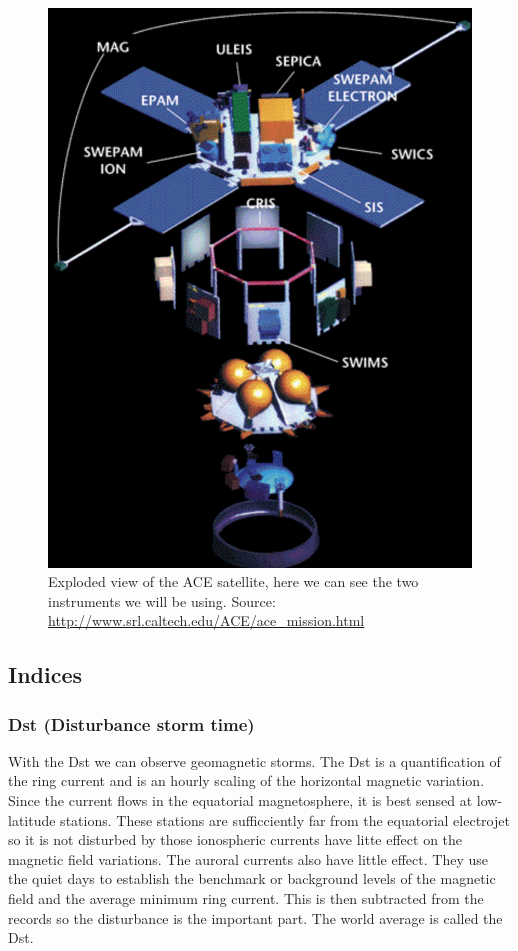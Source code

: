\documentclass[norsk,a4paper,12pt]{article}
\begin{document}
\begin{multicols}{2}
	\begin{figure}[H]
		\includegraphics[scale=0.5]{Figures/ace_exploded.png}
		\centering
		\caption{Exploded view of the ACE satellite, here we can see the two instruments we will be using. Source: \url{http://www.srl.caltech.edu/ACE/ace_mission.html}}
		\label{fig:ace_exploded}
	\end{figure}

\subsection{Indices} %
\label{sub:indices}

\subsubsection{Dst (Disturbance storm time)} %
\label{sub:Dst}
With the Dst we can observe geomagnetic storms. The Dst is a quantification of the ring current and is an hourly scaling of the horizontal magnetic variation. Since the current flows in the equatorial magnetosphere, it is best sensed at low-latitude stations. These stations are sufficciently far from the equatorial electrojet so it is not disturbed by those ionospheric currents have litte effect on the magnetic field variations. The auroral currents also have little effect. They use the quiet days to establish the benchmark or background levels of the magnetic field and the average minimum ring current. This is then subtracted from the records so the disturbance is the important part. The world average is called the Dst. 


\end{multicols}
\end{document}
